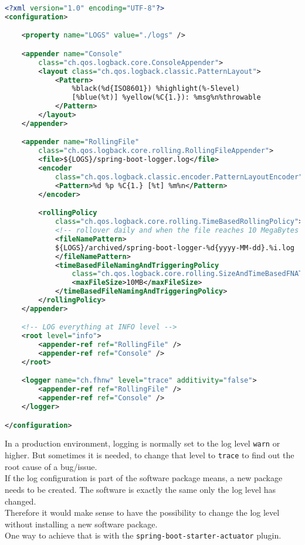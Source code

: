 \begin{lstlisting}[language=xml]
<?xml version="1.0" encoding="UTF-8"?>
<configuration>

    <property name="LOGS" value="./logs" />

    <appender name="Console"
        class="ch.qos.logback.core.ConsoleAppender">
        <layout class="ch.qos.logback.classic.PatternLayout">
            <Pattern>
                %black(%d{ISO8601}) %highlight(%-5level)
                [%blue(%t)] %yellow(%C{1.}): %msg%n%throwable
            </Pattern>
        </layout>
    </appender>

    <appender name="RollingFile"
        class="ch.qos.logback.core.rolling.RollingFileAppender">
        <file>${LOGS}/spring-boot-logger.log</file>
        <encoder
            class="ch.qos.logback.classic.encoder.PatternLayoutEncoder">
            <Pattern>%d %p %C{1.} [%t] %m%n</Pattern>
        </encoder>

        <rollingPolicy
            class="ch.qos.logback.core.rolling.TimeBasedRollingPolicy">
            <!-- rollover daily and when the file reaches 10 MegaBytes -->
            <fileNamePattern>
            ${LOGS}/archived/spring-boot-logger-%d{yyyy-MM-dd}.%i.log
            </fileNamePattern>
            <timeBasedFileNamingAndTriggeringPolicy
                class="ch.qos.logback.core.rolling.SizeAndTimeBasedFNATP">
                <maxFileSize>10MB</maxFileSize>
            </timeBasedFileNamingAndTriggeringPolicy>
        </rollingPolicy>
    </appender>

    <!-- LOG everything at INFO level -->
    <root level="info">
        <appender-ref ref="RollingFile" />
        <appender-ref ref="Console" />
    </root>

    <logger name="ch.fhnw" level="trace" additivity="false">
        <appender-ref ref="RollingFile" />
        <appender-ref ref="Console" />
    </logger>

</configuration>
\end{lstlisting}

In a production environment, logging is normally set to the log level
\verb|warn| or higher. But sometimes it is needed, to change that level
to \verb|trace| to find out the root cause of a bug/issue.\\
If the log configuration is part of the software package means, a
new package needs to be created. The software is exactly the same
only the log level has changed.\\
Therefore it would make sense to have the possibility to change
the log level without installing a new software package.\\
One way to achieve that is with the \verb|spring-boot-starter-actuator|
plugin.

